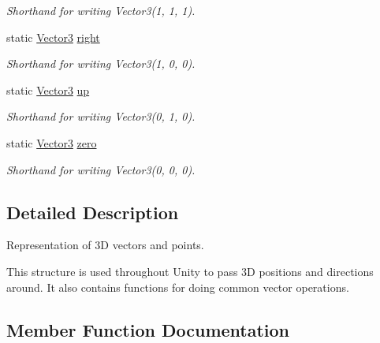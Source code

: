 \begin{DoxyCompactItemize}
\begin{DoxyCompactList}\small\item\em Shorthand for writing Vector3(1, 1, 1). \end{DoxyCompactList}\item 
static \mbox{\hyperlink{class_lua_1_1_vector3}{Vector3}} \mbox{\hyperlink{class_lua_1_1_vector3_ae8a79f66fb993fb1ad05c81fd3bbb9e3}{right}}
\begin{DoxyCompactList}\small\item\em Shorthand for writing Vector3(1, 0, 0). \end{DoxyCompactList}\item 
static \mbox{\hyperlink{class_lua_1_1_vector3}{Vector3}} \mbox{\hyperlink{class_lua_1_1_vector3_a63cc0e06476f86bd603c0a56bfa09fae}{up}}
\begin{DoxyCompactList}\small\item\em Shorthand for writing Vector3(0, 1, 0). \end{DoxyCompactList}\item 
static \mbox{\hyperlink{class_lua_1_1_vector3}{Vector3}} \mbox{\hyperlink{class_lua_1_1_vector3_aa45f0524375ebdaeb4244325ffb08210}{zero}}
\begin{DoxyCompactList}\small\item\em Shorthand for writing Vector3(0, 0, 0). \end{DoxyCompactList}\end{DoxyCompactItemize}


\subsection{Detailed Description}
Representation of 3D vectors and points. 

This structure is used throughout Unity to pass 3D positions and directions around. It also contains functions for doing common vector operations. 

\subsection{Member Function Documentation}
\mbox{\label{class_lua_1_1_vector3_ab278cbf1ea74ca78089e58c0a4313c6a}} 
